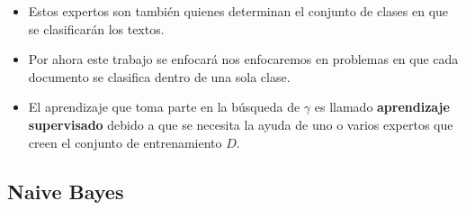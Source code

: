 \documentclass[t,compress,10pt,xcolor=dvipsnames]{beamer}
\begin{document}
{		\framebreak
		
		\begin{itemize}
		\item  Estos expertos son  tambi\'en quienes determinan el conjunto de clases en que se clasificar\'an los textos. 
		\item Por ahora este trabajo se enfocar\'a nos enfocaremos en problemas en que cada documento se clasifica dentro de una sola clase.
		\item El aprendizaje que toma parte en la b\'usqueda de $\gamma$ es llamado \textbf{aprendizaje supervisado} debido a que se necesita la ayuda de uno o varios expertos que creen el conjunto de entrenamiento $D$.
		\end{itemize}
		
		\framebreak
	
}
	\subsection{Naive Bayes}
\end{document}
